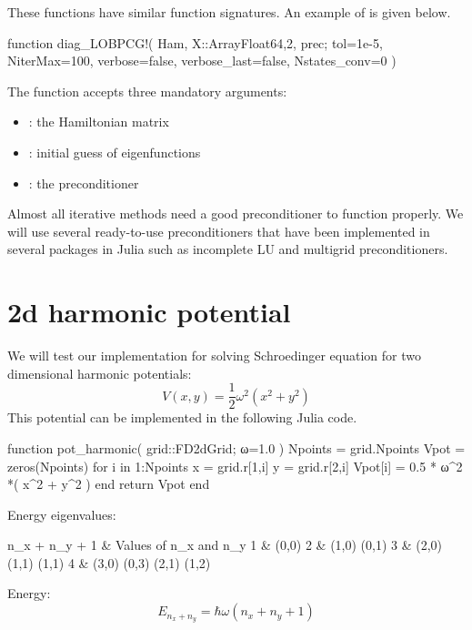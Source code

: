 These functions have similar function signatures. An example of 
is given below.
\begin{juliacode}
function diag_LOBPCG!( Ham, X::Array{Float64,2}, prec;
                       tol=1e-5, NiterMax=100, verbose=false,
                       verbose_last=false, Nstates_conv=0 )
\end{juliacode}
The function accepts three mandatory arguments:
\begin{itemize}
\item {}: the Hamiltonian matrix
\item {}: initial guess of eigenfunctions
\item {}: the preconditioner
\end{itemize}

Almost all iterative methods need a good preconditioner to function properly.
We will use several ready-to-use preconditioners that have been implemented
in several packages in Julia such as incomplete LU and multigrid preconditioners.

\section{2d harmonic potential}

We will test our implementation for solving Schroedinger equation for two
dimensional harmonic potentials:
\begin{equation}
V(x,y) = \frac{1}{2} \omega^2 (x^2 + y^2)
\end{equation}
This potential can be implemented in the following Julia code.
\begin{juliacode}
function pot_harmonic( grid::FD2dGrid; ω=1.0 )
  Npoints = grid.Npoints
  Vpot = zeros(Npoints)
  for i in 1:Npoints
    x = grid.r[1,i]
    y = grid.r[2,i]
    Vpot[i] = 0.5 * ω^2 *( x^2 + y^2 )
  end
  return Vpot
end
\end{juliacode}

Energy eigenvalues:
\begin{textcode}
n_x + n_y + 1  &  Values of n_x and n_y
1              &  (0,0)
2              &  (1,0) (0,1)
3              &  (2,0) (1,1) (1,1)
4              &  (3,0) (0,3) (2,1) (1,2)
\end{textcode}

Energy:
\begin{equation}
E_{n_{x} + n_{y}} = \hbar \omega \left( n_{x} + n_{y} + 1 \right)
\end{equation}

